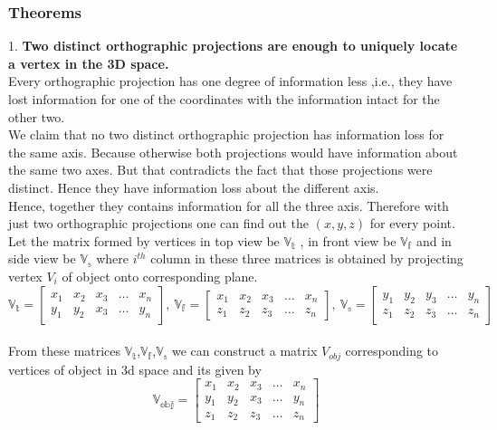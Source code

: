 \subsubsection{Theorems}
1. \textbf{Two distinct orthographic projections are enough to uniquely locate a vertex in the 3D space.} \\
Every orthographic projection has one degree of information less ,i.e., they have lost information for one of the coordinates with the information intact for the other two. \\
We claim that no two distinct orthographic projection has information loss for the same axis. Because otherwise both projections would have information about the same two axes. But that contradicts the fact that those projections were distinct. Hence they have information loss about the different axis. \\
Hence, together they contains information for all the three axis.
Therefore with just two orthographic projections one can find out the $(x, y, z)$ for every point.\\
Let the matrix formed by vertices in top view be $\mathbb{V_t}$
, in front view be $\mathbb{V_f}$ and in side view be  $\mathbb{V_s}$
 where $i^{th}$ column in these three matrices is obtained by projecting vertex $V_i$ of object onto corresponding plane.
 \[
 \mathbb{V_t} =  
 \begin{bmatrix}
    x_{1}       & x_{2} & x_{3} & \dots & x_{n} \\
    y_{1}       & y_{2} & x_{3} & \dots & y_{n} 
\end{bmatrix} ,\:
\mathbb{V_f} =  
 \begin{bmatrix}
    x_{1}       & x_{2} & x_{3} & \dots & x_{n} \\
    z_{1}       & z_{2} & z_{3} & \dots & z_{n} 
\end{bmatrix} ,\:
\mathbb{V_s} =  
 \begin{bmatrix}
    y_{1}       & y_{2} & y_{3} & \dots & y_{n} \\
    z_{1}       & z_{2} & z_{3} & \dots & z_{n} 
\end{bmatrix}\]\\
From these matrices $\mathbb{V_t}$,$\mathbb{V_f}$,$\mathbb{V_s}$ we can construct a matrix $V_{obj}$ corresponding to vertices of object in 3d space and its given by
\[
 \mathbb{V_{obj}} =  
 \begin{bmatrix}
    x_{1}       & x_{2} & x_{3} & \dots & x_{n} \\
    y_{1}       & y_{2} & x_{3} & \dots & y_{n} \\
    z_{1}       & z_{2} & z_{3} & \dots & z_{n} 
\end{bmatrix} \]
